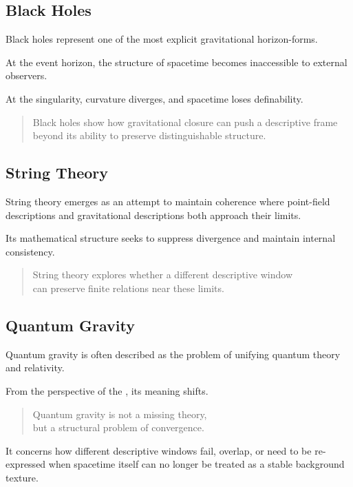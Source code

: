 \subsection{Black Holes}

Black holes represent one of the most explicit gravitational
horizon-forms.

At the event horizon,
the structure of spacetime becomes inaccessible to external observers.

At the singularity,
curvature diverges,
and spacetime loses definability.

\medskip
\begin{quote}
Black holes show how gravitational closure can push a descriptive frame
beyond its ability to preserve distinguishable structure.
\end{quote}
\medskip

\subsection{String Theory}

String theory emerges as an attempt
to maintain coherence where point-field descriptions
and gravitational descriptions both approach their limits.

Its mathematical structure
seeks to suppress divergence
and maintain internal consistency.

\medskip
\begin{quote}
String theory explores whether a different descriptive window\\
can preserve finite relations near these limits.
\end{quote}
\medskip

\subsection{Quantum Gravity}

Quantum gravity is often described
as the problem of unifying quantum theory and relativity.

From the perspective of the \DH{},
its meaning shifts.

\medskip
\begin{quote}
Quantum gravity is not a missing theory,\\
but a structural problem of convergence.
\end{quote}
\medskip

It concerns how different descriptive windows
fail,
overlap,
or need to be re-expressed
when spacetime itself can no longer be treated
as a stable background texture.

